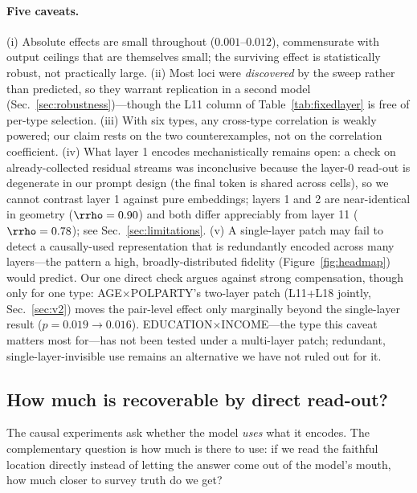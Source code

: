 \paragraph{Five caveats.} (i) Absolute effects are small
throughout ($0.001$--$0.012$), commensurate with output ceilings that are
themselves small; the surviving effect is statistically robust, not
practically large. (ii) Most loci were \emph{discovered} by the sweep
rather than predicted, so they warrant replication in a second model
(Sec.~\ref{sec:robustness})---though the L11 column of
Table~\ref{tab:fixedlayer} is free of per-type selection. (iii) With six
types, any cross-type correlation is weakly powered; our claim rests on
the two counterexamples, not on the correlation coefficient. (iv) What
layer 1 encodes mechanistically remains open: a check on already-collected
residual streams was inconclusive because the layer-0 read-out is
degenerate in our prompt design (the final token is shared across cells),
so we cannot contrast layer 1 against pure embeddings; layers 1 and 2 are
near-identical in geometry ($\rrho=0.90$) and both differ appreciably from
layer 11 ($\rrho=0.78$); see Sec.~\ref{sec:limitations}. (v) A
single-layer patch may fail to detect a causally-used representation that
is redundantly encoded across many layers---the pattern a high,
broadly-distributed fidelity (Figure~\ref{fig:headmap}) would predict. Our one direct check argues
against strong compensation, though only for one type: AGE$\times$POLPARTY's
two-layer patch (L11+L18 jointly, Sec.~\ref{sec:v2}) moves the
pair-level effect only marginally beyond the single-layer result
($p=0.019\to0.016$). EDUCATION$\times$INCOME---the type this caveat
matters most for---has not been tested under a multi-layer patch;
redundant, single-layer-invisible use remains an alternative we have
not ruled out for it.

\subsection{How much is recoverable by direct read-out?}
\label{sec:probe}
The causal experiments ask whether the model \emph{uses} what it encodes.
The complementary question is how much is there to use: if we read the
faithful location directly instead of letting the answer come out of the
model's mouth, how much closer to survey truth do we get?


